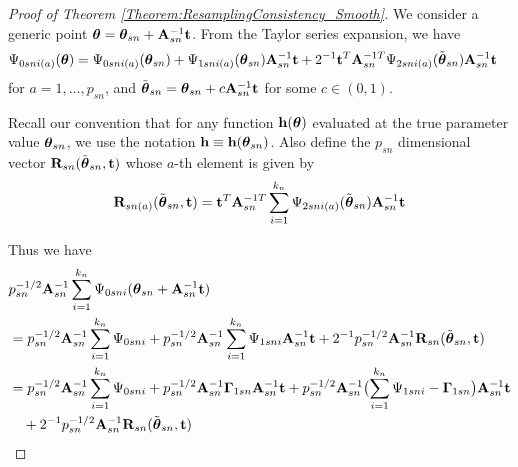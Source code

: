 \begin{proof}[Proof of Theorem \ref{Theorem:ResamplingConsistency_Smooth}]

We consider a generic point ${\boldsymbol{\theta}} = {\boldsymbol{\theta}}_{ s n} + {\mathbf{A}}_{ s n}^{-1} {\bf{t}}$. From the Taylor series expansion, we have
%
\begin{align}
\Psi_{0 s n i (a)} ({\boldsymbol{\theta}}) & = \Psi_{0 s n i (a)} ({\boldsymbol{\theta}}_{s n}) 
	+ \Psi_{1 s n i (a)} ({\boldsymbol{\theta}}_{s n}) {\mathbf{A}}_{ s n}^{-1} {\bf{t}} 
+ 2^{-1}  {\bf{t}}^{T} {\mathbf{A}}_{ s n}^{-1T} \Psi_{2 s n i (a)} (\tilde{{\boldsymbol{\theta}}}_{s n} ) 
{\mathbf{A}}_{ s n}^{-1} {\bf{t}}
\end{align}
%
for $a = 1, \ldots, p_{sn}$, and $\tilde{{\boldsymbol{\theta}}}_{s n} = {{\boldsymbol{\theta}}}_{s n}  + c {\mathbf{A}}_{s n}^{-1} {\bf{t}}$ for some $c \in (0, 1)$.

Recall our convention that for any function ${\bf{h}} ({\boldsymbol{\theta}})$ evaluated at the true parameter value ${\boldsymbol{\theta}}_{ s n}$, we use the notation ${\bf{h}} \equiv {\bf{h}} ({\boldsymbol{\theta}}_{s n})$. Also define the $p_{ s n}$ dimensional vector 
${\mathbf{R}}_{ s n} (\tilde{{\boldsymbol{\theta}}}_{s n },  {\bf{t}})$ whose $a$-th element is given by 
\begin{align} 
{\mathbf{R}}_{ s n (a)} (\tilde{{\boldsymbol{\theta}}}_{s n},  {\bf{t}})
=  {\bf{t}}^{T} {\mathbf{A}}_{ s n}^{-1T} 
\sum_{i =1}^{k_{n}} \Psi_{2 s n i (a)} (\tilde{{\boldsymbol{\theta}}}_{s n} ) {\mathbf{A}}_{ s n}^{-1} {\bf{t}}
\end{align}

Thus we have 
\begin{align}
& p_{s n}^{-1/2} {\mathbf{A}}_{ s n}^{-1} \sum_{i = 1}^{ k_{n}} \Psi_{0 s n i} 
({\boldsymbol{\theta}}_{ s n} + {\mathbf{A}}_{ s n}^{-1} {\bf{t}}) \notag\\
& = p_{s n}^{-1/2} {\mathbf{A}}_{ s n}^{-1} \sum_{i = 1}^{ k_{n}} \Psi_{0 s n i}  
	+  p_{s n}^{-1/2} {\mathbf{A}}_{ s n}^{-1} \sum_{i = 1}^{ k_{n}} \Psi_{1 s n i} {\mathbf{A}}_{ s n}^{-1} {\bf{t}} 
+ 2^{-1}  p_{s n}^{-1/2} {\mathbf{A}}_{ s n}^{-1} {\mathbf{R}}_{ s n} (\tilde{{\boldsymbol{\theta}}}_{s n },  {\bf{t}}) \notag\\
& = p_{s n}^{-1/2} {\mathbf{A}}_{ s n}^{-1} \sum_{i = 1}^{ k_{n}} \Psi_{0 s n i}  
	+ p_{s n}^{-1/2} {\mathbf{A}}_{ s n}^{-1} {\boldsymbol{\Gamma}}_{1 s n } {\mathbf{A}}_{ s n}^{-1} {\bf{t}} 
 + p_{s n}^{-1/2} {\mathbf{A}}_{ s n}^{-1} 
 \bigl( \sum_{i = 1}^{ k_{n}} \Psi_{1 s n i} - {\boldsymbol{\Gamma}}_{1 s n } \bigr) 
 {\mathbf{A}}_{ s n}^{-1} {\bf{t}} \notag\\
& \quad + 2^{-1} p_{s n}^{-1/2}  {\mathbf{A}}_{ s n}^{-1} {\mathbf{R}}_{ s n} (\tilde{{\boldsymbol{\theta}}}_{s n },  {\bf{t}})
\end{align}


\end{proof}
